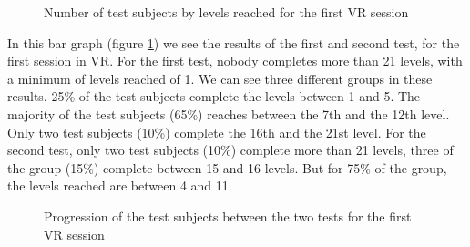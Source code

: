 \documentclass[12pt, openany, twocolumn]{article}
\begin{document}
                \begin{figure}[H]
                    \centering
                    \setlength{\fboxsep}{0pt}
                    \caption{Number of test subjects by levels reached for the first VR session}
                    \label{figure4}
                \end{figure}

            In this bar graph (figure \ref{figure4}) we see the results of the first and second test, for the first session in VR.
            For the first test, nobody completes more than 21 levels, with a minimum of levels reached of 1.
            We can see three different groups in these results.
            25\% of the test subjects complete the levels between 1 and 5.
            The majority of the test subjects (65\%) reaches between the 7th and the 12th level.
            Only two test subjects (10\%) complete the 16th and the 21st level.
            For the second test, only two test subjects (10\%) complete more than 21 levels, three of the group (15\%) complete between 15 and 16 levels. 
            But for 75\% of the group, the levels reached are between 4 and 11.
            
                \begin{figure}[H]
                    \centering
                    \setlength{\fboxsep}{0pt}
                    \caption{Progression of the test subjects between the two tests for the first VR session}
                    \label{figure5}
                \end{figure}
\end{document}
